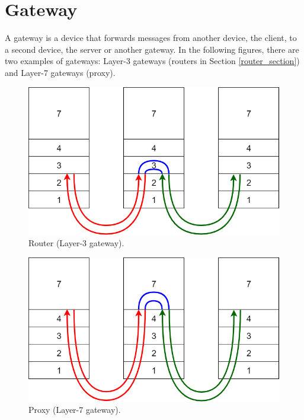 \chapter{Gateway}
A gateway is a device that forwards messages from another device, the client, to a second device, the server or another gateway.
In the following figures, there are two examples of gateways: Layer-3 gateways (routers in Section \ref{router_section}) and Layer-7 gateways (proxy).
\begin{figure}[h]
\centering
\includegraphics[scale=0.4]{Images/Gateway/gateway_3}
\caption{\footnotesize{Router (Layer-3 gateway).}}\label{gateway_3}
\end{figure}
\begin{figure}[h]
\centering
\includegraphics[scale=0.4]{Images/Gateway/gateway_7}
\caption{\footnotesize{Proxy (Layer-7 gateway).}}\label{gateway_7}
\end{figure}

